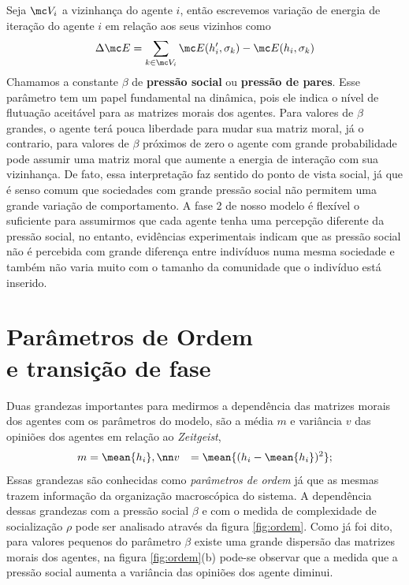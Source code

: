 Seja $\mc V_i$ a vizinhança do agente $i$, então escrevemos variação de energia
de iteração do agente $i$ em relação aos seus vizinhos como
\[
\Delta \mc E 
= \sum_{k\in\mc V_i } \mc E(h_i',\sigma_k) - \mc E(h_i,\sigma_k)
\]
Chamamos a constante $\beta$ de \textbf{pressão social} ou \textbf{pressão de
pares}. Esse parâmetro tem um papel fundamental na dinâmica, pois ele indica
o nível de flutuação aceitável para as matrizes morais dos agentes. Para
valores de $\beta$ grandes, o agente terá pouca liberdade para mudar sua
matriz moral, já o contrario, para valores de $\beta$ próximos de zero o
agente com grande probabilidade pode assumir uma matriz moral que aumente a
energia de interação com sua vizinhança. De fato, essa interpretação faz
sentido do ponto de vista social, já que é senso comum que sociedades com
grande pressão social não permitem uma grande variação de comportamento.
A fase 2 de nosso modelo é flexível o suficiente para assumirmos que cada
agente tenha uma percepção diferente da pressão social, no entanto,
evidências experimentais\cite{Panagopoulos2011} indicam que as pressão
social não é percebida com grande diferença entre indivíduos numa mesma
sociedade e também não varia muito com o tamanho da comunidade que o
indivíduo está inserido.

\section{Parâmetros de Ordem \\ e transição de fase}  %

Duas grandezas importantes para medirmos a dependência das matrizes morais
dos agentes com os parâmetros do modelo, são a média $m$ e variância $v$
das opiniões dos agentes em relação ao \textit{Zeitgeist},
\begin{align}
    m &= \mean{h_i}, \nn
    v &= \mean{(h_i - \mean{h_i})^2};
\end{align}
Essas grandezas são conhecidas como \textit{parâmetros de ordem} já que
as mesmas trazem informação da organização macroscópica do sistema. A
dependência dessas grandezas com a  pressão social $\beta$ e com o medida
de complexidade de socialização $\rho$ pode ser analisado através da figura
\ref{fig:ordem}. Como já foi dito, para valores pequenos do parâmetro $\beta$
existe uma grande dispersão das matrizes morais dos agentes, na figura
\ref{fig:ordem}(b) pode-se observar que a medida que a pressão social
aumenta a variância das opiniões dos agente diminui.

